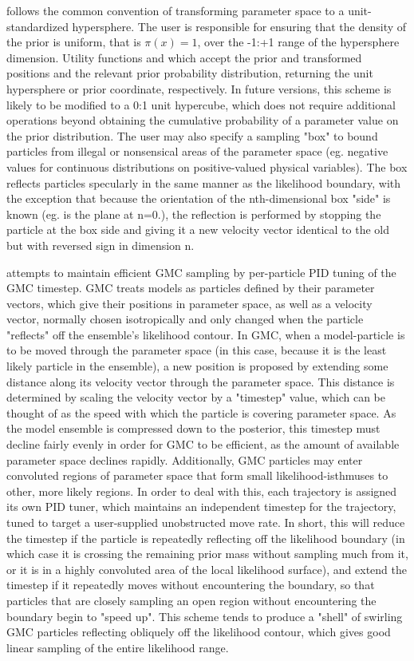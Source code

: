  follows the common convention of transforming parameter space to a unit-standardized hypersphere. The user is responsible for ensuring that the density of the prior is uniform, that is $\pi(x) = 1$, over the -1:+1 range of the hypersphere dimension. Utility functions  and  which accept the prior and transformed positions and the relevant prior probability distribution, returning the unit hypersphere or prior coordinate, respectively. In future versions, this scheme is likely to be modified to a 0:1 unit hypercube, which does not require additional operations beyond obtaining the cumulative probability of a parameter value on the prior distribution. The user may also specify a sampling "box" to bound particles from illegal or nonsensical areas of the parameter space (eg. negative values for continuous distributions on positive-valued physical variables). The box reflects particles specularly in the same manner as the likelihood boundary, with the exception that because the orientation of the nth-dimensional box "side" is known (eg. is the plane at n=0.), the reflection is performed by stopping the particle at the box side and giving it a new velocity vector identical to the old but with reversed sign in dimension n. 

 attempts to maintain efficient GMC sampling by per-particle PID tuning of the GMC timestep. GMC treats models as particles defined by their parameter vectors, which give their positions in parameter space, as well as a velocity vector, normally chosen isotropically and only changed when the particle "reflects" off the ensemble's likelihood contour. In GMC, when a model-particle is to be moved through the parameter space (in this case, because it is the least likely particle in the ensemble), a new position is proposed by extending some distance along its velocity vector through the parameter space. This distance is determined by scaling the velocity vector by a "timestep" value, which can be thought of as the speed with which the particle is covering parameter space. As the model ensemble is compressed down to the posterior, this timestep must decline fairly evenly in order for GMC to be efficient, as the amount of available parameter space declines rapidly. Additionally, GMC particles may enter convoluted regions of parameter space that form small likelihood-isthmuses to other, more likely regions. In order to deal with this, each trajectory is assigned its own PID tuner, which maintains an independent timestep for the trajectory, tuned to target a user-supplied unobstructed move rate. In short, this will reduce the timestep if the particle is repeatedly reflecting off the likelihood boundary (in which case it is crossing the remaining prior mass without sampling much from it, or it is in a highly convoluted area of the local likelihood surface), and extend the timestep if it repeatedly moves without encountering the boundary, so that particles that are closely sampling an open region without encountering the boundary begin to "speed up". This scheme tends to produce a "shell" of swirling GMC particles reflecting obliquely off the likelihood contour, which gives good linear sampling of the entire likelihood range.

